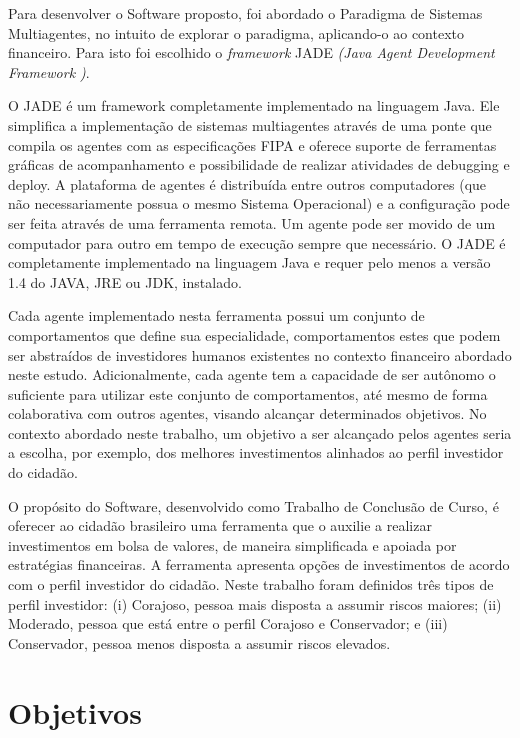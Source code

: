 Para desenvolver o Software proposto, foi abordado o Paradigma de Sistemas Multiagentes, no intuito de explorar o paradigma, aplicando-o ao contexto financeiro. Para isto foi escolhido o \textit{framework} JADE  \textit{(Java Agent Development Framework )}.

\begin{citacao}
O JADE é um framework completamente implementado na linguagem Java. Ele simplifica a implementação de sistemas multiagentes através de uma ponte que compila os agentes com as especificações FIPA e oferece suporte de ferramentas gráficas de acompanhamento e possibilidade de realizar atividades de debugging e deploy.  A plataforma de agentes é distribuída entre outros computadores (que não necessariamente possua o mesmo Sistema Operacional) e a configuração pode ser feita através de uma ferramenta remota. Um agente pode ser movido de um computador para outro em tempo de execução sempre que necessário. O JADE é completamente implementado na linguagem Java e requer pelo menos a versão 1.4 do JAVA, JRE ou  JDK, instalado. \cite{telecon2014}
\end{citacao}

Cada agente implementado nesta ferramenta possui um conjunto de comportamentos que define sua especialidade, comportamentos estes que podem ser abstraídos de investidores humanos existentes no contexto financeiro abordado neste estudo. Adicionalmente, cada agente tem a capacidade de ser autônomo o suficiente para utilizar este conjunto de comportamentos, até mesmo de forma colaborativa com outros agentes, visando alcançar determinados objetivos. No contexto abordado neste trabalho, um objetivo a ser alcançado pelos agentes seria a escolha, por exemplo, dos melhores investimentos alinhados ao perfil investidor do cidadão.

O propósito do Software, desenvolvido como Trabalho de Conclusão de Curso, é oferecer ao cidadão brasileiro uma ferramenta que o auxilie a realizar investimentos em bolsa de valores, de maneira simplificada e apoiada por estratégias financeiras. A ferramenta apresenta opções de investimentos de acordo com o perfil investidor do cidadão. Neste trabalho foram definidos três tipos de perfil investidor: (i) Corajoso, pessoa mais disposta a assumir riscos maiores; (ii) Moderado, pessoa que está entre o perfil Corajoso e Conservador; e (iii) Conservador, pessoa menos disposta a assumir riscos elevados.


\section{Objetivos}

